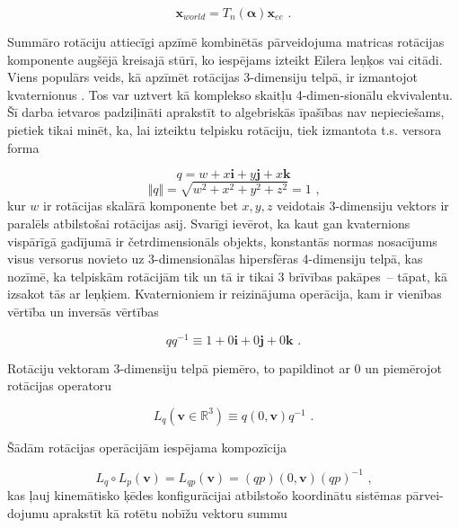 \documentclass[12pt, a4paper]{article}
\numberwithin{equation}{section} %
\begin{document}
\begin{equation}
    \boldsymbol{x}_{world} = T_{n}(\boldsymbol{\alpha})\boldsymbol{x}_{ee}
\text{ .}
\end{equation}

Summāro rotāciju attiecīgi apzīmē kombinētās pārveidojuma matricas rotācijas \newline komponente augšējā kreisajā stūrī, ko iespējams izteikt Eilera leņķos vai citādi. Viens populārs veids, kā apzīmēt rotācijas 3-dimensiju telpā, ir izmantojot kvaternionus \cite{quaternions_illinois}. Tos var uztvert kā komplekso skaitļu 4-dimen-sionālu ekvivalentu. Šī darba ietvaros padziļināti aprakstīt to algebriskās īpašības nav nepieciešams, pietiek tikai minēt, ka, lai izteiktu telpisku rotāciju, tiek izmantota t.s. versora forma

\begin{equation}
    q = w + x\boldsymbol{i} + y\boldsymbol{j} + x\boldsymbol{k}
\end{equation}
\begin{equation}
    \Vert q \Vert = \sqrt{w^2 + x^2 + y^2 + z^2} = 1
\text{ ,}
\end{equation}
kur $w$ ir rotācijas skalārā komponente bet $x,y,z$ veidotais 3-dimensiju vektors ir paralēls atbilstošai rotācijas asij. Svarīgi ievērot, ka kaut gan kvaternions vispārīgā gadījumā ir četrdimensionāls objekts, konstantās normas nosacījums visus versorus novieto uz 3-dimensionālas hipersfēras 4-dimensiju telpā, kas nozīmē, ka telpiskām rotācijām tik un tā ir tikai 3 brīvības pakāpes~-- tāpat, kā izsakot tās ar leņķiem. Kvaternioniem ir reizinājuma operācija, kam ir vienības vērtība un inversās vērtības

\begin{equation}
    qq^{-1} \equiv 1 +  0\boldsymbol{i} + 0\boldsymbol{j} + 0\boldsymbol{k}
\text{ .}
\end{equation}

Rotāciju vektoram 3-dimensiju telpā piemēro, to papildinot ar 0 un piemērojot rotācijas operatoru

\begin{equation}
    L_q(\boldsymbol{v} \in \mathbb{R}^3) \equiv q(0,\boldsymbol{v})q^{-1}
    \text{ .}
\end{equation}

Šādām rotācijas operācijām iespējama kompozīcija

\begin{equation}
    L_q \circ L_p (\boldsymbol{v}) = L_{qp}(\boldsymbol{v}) = (qp)(0,\boldsymbol{v})(qp)^{-1}
\text{ ,}
\end{equation}
kas ļauj kinemātisko ķēdes konfigurācijai atbilstošo koordinātu sistēmas pārvei-dojumu aprakstīt kā rotētu nobīžu vektoru summu
\end{document}
